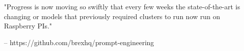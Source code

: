 \documentclass{beamer}
\begin{document}
\begin{frame}[plain]
\end{frame}


\begin{frame}
	"Progress is now moving so swiftly that every few weeks the state-of-the-art is changing or models that previously required clusters to run now run on Raspberry PIs."
	 
	 -- https://github.com/brexhq/prompt-engineering
\end{frame}

\end{document}

